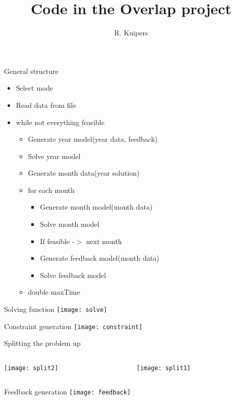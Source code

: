 \documentclass{beamer}
\title[Code]{Code in the Overlap project}
\author{R. Kuipers}
\begin{document}
\begin{frame}{General structure}
\begin{itemize}
\item Select mode
\item Read data from file
\item while not everything feasible
	\begin{itemize}
	\item Generate year model(year data, feedback)
	\item Solve year model
	\item Generate month data(year solution)
	\item for each month
		\begin{itemize}
		\item Generate month model(month data)
		\item Solve month model
		\item If feasible -$>$ next month
		\item Generate feedback model(month data)
		\item Solve feedback model	
		\end{itemize}
	\item double maxTime
	\end{itemize}
\end{itemize}
\end{frame}

\begin{frame}{Solving function}
\texttt{[image: solve]}
\end{frame}

\begin{frame}{Constraint generation}
\texttt{[image: constraint]}
\end{frame}

\begin{frame}{Splitting the problem up}
\begin{columns}
\begin{column}{0.67\textwidth}
\texttt{[image: split2]}
\end{column}
\begin{column}{0.33\textwidth}
\texttt{[image: split1]}
\end{column}
\end{columns}
\end{frame}

\begin{frame}{Feedback generation}
\texttt{[image: feedback]}
\end{frame}
\end{document}
